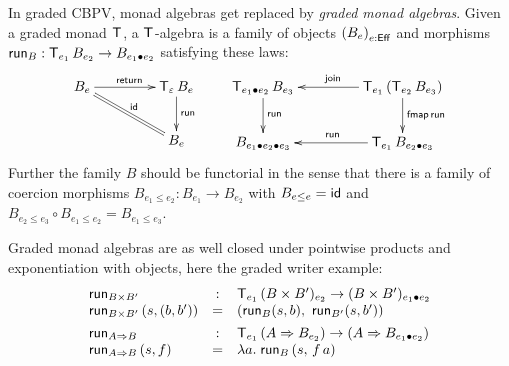 \documentclass[acmsmall,review,anonymous]{acmart}\settopmatter{printfolios=true,printccs=false,printacmref=false}
\begin{document}
In graded CBPV, monad algebras get replaced by \emph{graded monad
  algebras}.  Given a graded monad $\T$, a $\T$-algebra is a family of
objects $\left(B_e\right)_{e:\Eff}$ and morphisms
$\run[B] : \T[e_1]\,B_{e_2} \to B_{e_1 \bu e_2}$ satisfying these
laws:
\[
\xymatrix@C=10ex{
  B_e     \ar[r]^{\treturn} \ar@{=}[dr]^{\tid}
& \T[\Ge]\,B_e \ar[d]^{\run[]}
\\
& B_e
}
\qquad
\xymatrix@C=10ex{
  \T[e_1 \bu e_2]\,B_{e_3} \ar[d]^{\run[]}
& \T[e_1]\,(\T[e_2]\,B_{e_3}) \ar[l]_{\tjoin} \ar[d]^{\tfmap\,\run[]}
\\
  B_{e_1 \bu e_2 \bu e_3}
& \T[e_1]\,B_{e_2 \bu e_3} \ar[l]_{\run[]}
}
\]
Further the family $B$ should be functorial in the sense that there is
a family of coercion morphisms $B_{e_1 \leq e_2} : B_{e_1} \to B_{e_2}$ with
$B_{e \leq e} = \tid$ and $B_{e_2 \leq e_3} \circ B_{e_1 \leq e_2} =
B_{e_1 \leq e_3}$.

Graded monad algebras are as well closed under pointwise products and
exponentiation with objects, here the graded writer example:
\[
\begin{array}{lcl}
  \run[B \times B'] & : & \T[e_1]\,(B \times B')_{e_2} \to (B \times
                          B')_{e_1 \bu e_2} \\
  \run[B \times B']\, (s,(b,b')) & = & (\run[B] (s,b),\
                                           \run[B'] (s,b'))
\\[1ex]
  \run[A \To B] & : & \T[e_1]\,(A \To B_{e_2}) \to (A \To B_{e_1 \bu e_2}) \\
  \run[A \To B]\, (s,f) & = & \lambda a.\; \run[B]\,(s,\,f\,a)
\\
\end{array}
\]
\end{document}
